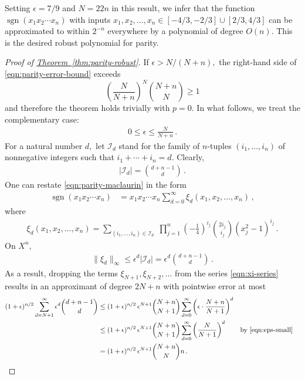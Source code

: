 \documentclass[10pt]{article}
\theoremstyle{definition}
\numberwithin{equation}{section}
\newcommand{\expref}[2]{\texorpdfstring{\hyperref[#2]{#1~\ref{#2}}}{#1~\ref{#2}}}
\newcommand{\PARENS}[1]{\left(#1\right)}
\newcommand{\abs}[1]{\lvert#1\rvert}
\DeclareMathOperator{\sign}{sgn}
\begin{document}
Setting $\epsilon=7/9$ and $N=22n$ in this result, we infer that
the function $\sign (x_1x_2\cdots x_n)$ with inputs
$x_1,x_2,\dots,x_n\in[-4/3,-2/3]\cup[2/3,4/3]$ can be
approximated to within $2^{-n}$ everywhere 
by a polynomial of degree $O(n)$. This is the
desired robust polynomial for parity.

\begin{proof}[Proof of \expref{Theorem}{thm:parity-robust}]
If $\epsilon>N/{(N+n)},$ the right-hand side of 
\eqref{eqn:parity-error-bound} exceeds 
\[
\left(\frac N{N+n}\right)^N{N+n\choose N}\geq1
\]
and therefore the theorem holds trivially with $p=0$. 
In what follows, we treat the complementary case:
\begin{align}
\label{eqn:eps-small}
0\leq\epsilon\leq\frac N{N+n}\,.
\end{align}
For a natural number $d,$ let
$\mathcal{I}_d$ stand for the family of $n$-tuples
$(i_1,\dots,i_n)$ of nonnegative integers such that
$i_1+\cdots+i_n=d$. Clearly,
\begin{align*}
\abs{\mathcal{I}_d} = {d+n-1\choose d}\,.
\end{align*}
One can restate \eqref{eqn:parity-maclaurin} in the
form
\begin{align}
\sign(x_1x_2\cdots x_n) 
  &= x_1x_2\cdots x_n \sum_{d=0}^\infty
  \xi_d(x_1,x_2,\dots,x_n)\,,
\label{eqn:xi-series}
\end{align}
where
\begin{align*}
 \xi_d(x_1,x_2,\dots,x_n) = \sum_{(i_1,\dots,i_n)\in
 \mathcal I_d}
  \;\prod_{j=1}^n 
       \PARENS{-\frac14}^{i_j}{2i_j \choose i_j} (x_j^2-1)^{i_j}\,.
\end{align*}
On $X^n,$ 
\begin{align*}
\|\xi_d\|_\infty \leq \epsilon^d |\mathcal I_d|
=\epsilon^d{d+n-1\choose d}\,.
\end{align*}
As a result, dropping the terms
$\xi_{N+1},\xi_{N+2},\dots$ from the series
\eqref{eqn:xi-series} results in an approximant 
of degree $2N+n$ with pointwise error at most
\begin{align*}
(1+\epsilon)^{n/2}\sum_{d=N+1}^\infty
\epsilon^d{d+n-1\choose d}
&\leq (1+\epsilon)^{n/2}\,\epsilon^{N+1}{N+n\choose N+1}
\sum_{d=0}^\infty
\PARENS{\epsilon\cdot\frac{N+n}{N+1}}^d\\
&\leq (1+\epsilon)^{n/2}\,\epsilon^{N+1}{N+n\choose N+1}
\sum_{d=0}^\infty
\PARENS{\frac N{N+1}}^d 
&&\text{by \eqref{eqn:eps-small}}\\
&= (1+\epsilon)^{n/2}\,\epsilon^{N+1}{N+n\choose N}n\,.
&&\qedhere
\end{align*} 
\end{proof}
 
\end{document}
